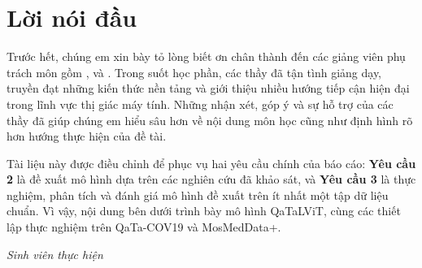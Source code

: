 \chapter*{Lời nói đầu}

Trước hết, chúng em xin bày tỏ lòng biết ơn chân thành đến các giảng viên phụ trách môn \coursename{} gồm \advisorone, \advisortwo{} và \advisorthree. Trong suốt học phần, các thầy đã tận tình giảng dạy, truyền đạt những kiến thức nền tảng và giới thiệu nhiều hướng tiếp cận hiện đại trong lĩnh vực thị giác máy tính. Những nhận xét, góp ý và sự hỗ trợ của các thầy đã giúp chúng em hiểu sâu hơn về nội dung môn học cũng như định hình rõ hơn hướng thực hiện của đề tài.

Tài liệu này được điều chỉnh để phục vụ hai yêu cầu chính của báo cáo: \textbf{Yêu cầu 2} là đề xuất mô hình dựa trên các nghiên cứu đã khảo sát, và \textbf{Yêu cầu 3} là thực nghiệm, phân tích và đánh giá mô hình đề xuất trên ít nhất một tập dữ liệu chuẩn. Vì vậy, nội dung bên dưới trình bày mô hình QaTaLViT, cùng các thiết lập thực nghiệm trên QaTa-COV19 và MosMedData+.

\vspace{1cm}

\begin{flushright}
\textit{Sinh viên thực hiện}\\
\textit{\studentone}\\
\textit{\studenttwo}
\end{flushright}

\clearpage
